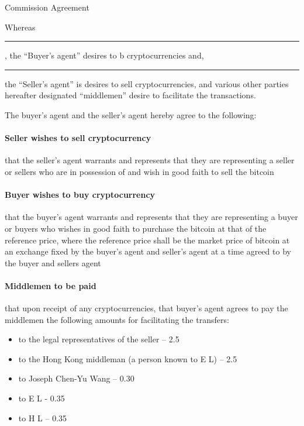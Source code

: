 \documentclass[10pt]{article}
\begin{document}
\begin{center}
{\Large Commission Agreement}
\end{center}



Whereas \rule{6cm}{.2pt}, the “Buyer’s agent” desires to
b cryptocurrencies and, \rule{6cm}{.2pt}the “Seller’s agent” is desires to sell cryptocurrencies, and various other parties hereafter designated “middlemen” desire to facilitate the transactions.  

The buyer’s agent and the seller’s agent hereby agree to the
following:


\paragraph{Seller wishes to sell cryptocurrency} that the seller’s agent warrants and represents that they are representing a seller or sellers who are in possession of and wish in good faith to sell the bitcoin

\paragraph{Buyer wishes to buy cryptocurrency} that the buyer’s agent warrants and represents that they are representing a buyer or buyers who wishes in good faith to purchase the bitcoin at that  of the reference price, where the reference price shall be the market price of bitcoin at an exchange fixed by the buyer’s agent and seller’s agent at a time agreed to by the buyer and sellers agent

\paragraph{Middlemen to be paid} that upon receipt of any cryptocurrencies, that buyer’s agent agrees to pay the middlemen the following amounts for facilitating the transfers:
\begin{itemize}
\item to the legal representatives of the seller – 2.5%
\item to the Hong Kong middleman (a person known to E L) – 2.5%
\item  to Joseph Chen-Yu Wang – 0.30%
\item to E L - 0.35%
\item  to H L – 0.35%
\end{itemize}
\end{document}
